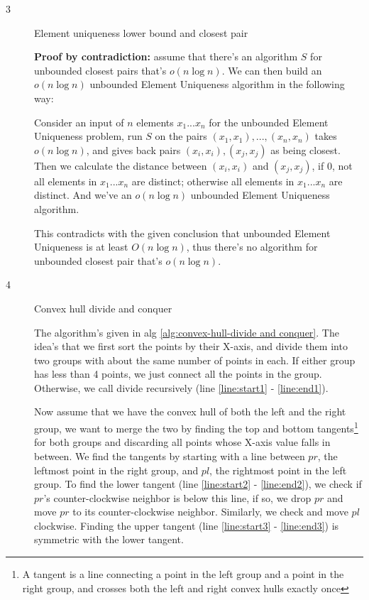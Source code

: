 \documentclass{article}
\begin{document}
\begin{description}
\item[3]{Element uniqueness lower bound and closest pair}
 
  \textbf{Proof by contradiction:} assume that there's an algorithm $S$ for unbounded closest pairs that's $o(n \log n)$. We can then build an $o(n \log n)$ unbounded Element Uniqueness algorithm in the following way:

  Consider an input of $n$ elements $x_1...x_n$ for the unbounded Element Uniqueness problem, run $S$ on the pairs $(x_1, x_1), ..., (x_n, x_n)$ takes $o (n \log n)$, and gives back pairs $(x_i, x_i), (x_j, x_j)$ as being closest. Then we calculate the distance between $(x_i, x_i)$ and $(x_j, x_j)$, if 0, not all elements in $x_1...x_n$ are distinct; otherwise all elements in $x_1...x_n$ are distinct. And we've an $o(n \log n)$ unbounded Element Uniqueness algorithm.

  This contradicts with the given conclusion that unbounded Element Uniqueness is at least $O(n \log n)$, thus there's no algorithm for unbounded closest pair that's $o(n \log n)$.

\item[4]{Convex hull divide and conquer}

  The algorithm's given in alg \ref{alg:convex-hull-divide and conquer}. The idea's that we first sort the points by their X-axis, and divide them into two groups with about the same number of points in each. If either group has less than 4 points, we just connect all the points in the group. Otherwise, we call divide recursively (line \ref{line:start1} - \ref{line:end1}).

  Now assume that we have the convex hull of both the left and the right group, we want to merge the two by finding the top and bottom tangents\footnote{A tangent is a line connecting a point in the left group and a point in the right group, and crosses both the left and right convex hulls exactly once} for both groups and discarding all points whose X-axis value falls in between. We find the tangents by starting with a line between $pr$, the leftmost point in the right group, and $pl$, the rightmost point in the left group. To find the lower tangent (line \ref{line:start2} - \ref{line:end2}), we check if $pr$'s counter-clockwise neighbor is below this line, if so, we drop $pr$ and move $pr$ to its counter-clockwise neighbor. Similarly, we check and move $pl$ clockwise. Finding the upper tangent (line \ref{line:start3} - \ref{line:end3}) is symmetric with the lower tangent.


\end{description}
\end{document}
